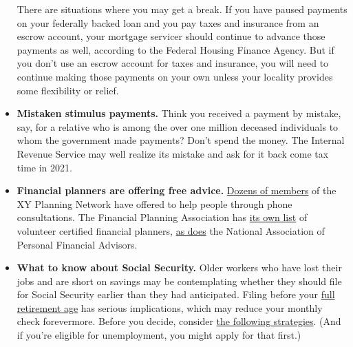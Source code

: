 \begin{itemize}
  There are situations where you may get a break. If you have paused
  payments on your federally backed loan and you pay taxes and insurance
  from an escrow account, your mortgage servicer should continue to
  advance those payments as well, according to the Federal Housing
  Finance Agency. But if you don't use an escrow account for taxes and
  insurance, you will need to continue making those payments on your own
  unless your locality provides some flexibility or relief.
\item
  \textbf{Mistaken stimulus payments.} Think you received a payment by
  mistake, say, for a relative who is among the over one million
  deceased individuals to whom the government made payments? Don't spend
  the money. The Internal Revenue Service may well realize its mistake
  and ask for it back come tax time in 2021.
\item
  \textbf{Financial planners are offering free advice.}
  \href{https://www.xyplanningnetwork.com/?_advisor_search=\%22coronavirus\%20relief\%22}{Dozens
  of members} of the XY Planning Network have offered to help people
  through phone consultations. The Financial Planning Association has
  \href{https://www.onefpa.org/Pages/ProBonoPlanning.aspx}{its own list}
  of volunteer certified financial planners,
  \href{https://www.napfa.org/find-an-advisor}{as does} the National
  Association of Personal Financial Advisors.
\item
  \textbf{What to know about Social Security.} Older workers who have
  lost their jobs and are short on savings may be contemplating whether
  they should file for Social Security earlier than they had
  anticipated. Filing before your
  \href{https://www.ssa.gov/planners/retire/retirechart.html}{full
  retirement age} has serious implications, which may reduce your
  monthly check forevermore. Before you decide, consider
  \href{https://www.nytimes.com/2020/04/17/business/retiring-social-security-jobs-coronavirus-pandemic.html}{the
  following strategies}. (And if you're eligible for unemployment, you
  might apply for that first.)


\end{itemize}
